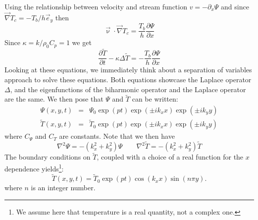 Using the relationship between velocity and stream function
$v=-\partial_x \Psi$
and since $\vec\nabla T_c = - T_b/h \vec{e}_y$ then
\[
{\vec \upnu}\cdot {\vec \nabla} T_c =  \frac{T_b}{h}   \frac{\partial \Psi}{\partial x} 
\]
Since $\kappa =k/\rho_0 C_p=1$ we get 
\begin{equation}
\boxed{
\frac{\partial \tilde{T}}{\partial t} - \kappa \Delta \tilde{T} 
= -  \frac{T_b}{h}   \frac{\partial \Psi}{\partial x}
}
\end{equation}
Looking at these equations, we immediately think about a separation of variables approach to solve these
equations. Both equations showcase the Laplace operator $\Delta$, and the eigenfunctions of the biharmonic operator and the Laplace operator are the same. 
We then pose that $\Psi$ and $\tilde{T}$ can be written:
\begin{eqnarray}
\Psi(x,y,t) &=& \Psi_0 \exp(pt)\exp(\pm i k_x x) \exp(\pm i k_y y) \\ %
\tilde{T}(x,y,t) &=& \tilde{T}_0 \exp(pt) \exp(\pm i k_x x) \exp(\pm i k_y y) %
\end{eqnarray}
where $C_\Psi$ and $C_T$ are constants.
Note that we then have
\[
\nabla^2 \Psi = -(k_x^2+k_y^2) \Psi
\quad\quad
\nabla^2 \tilde{T} = -(k_x^2+k_y^2) \tilde{T}
\]
The boundary conditions on $\tilde{T}$, 
coupled with a choice of a real function for the $x$ dependence 
yields\footnote{We assume here that temperature is a real quantity, not a complex one.}:
\[
\tilde{T}(x,y,t) = \tilde{T}_0 \exp(pt) \cos (k_x x) \sin (n\pi y).
\]
where $n$ is an integer number. 

